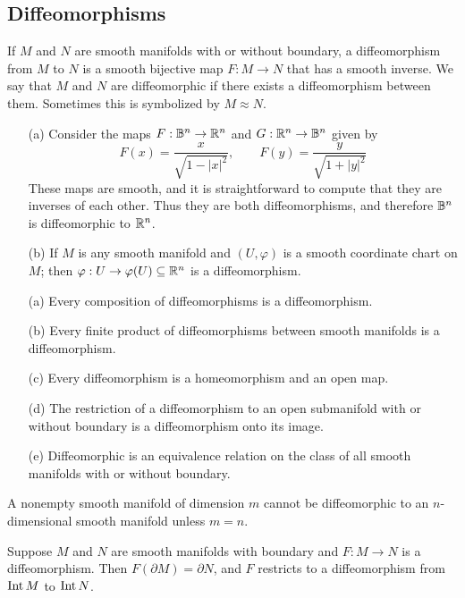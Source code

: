 \subsection{Diffeomorphisms}
If $M$ and $N$ are smooth manifolds with or without boundary, a diffeomorphism from $M$ to $N$ is a smooth bijective map $F:M\to N$ that has a smooth inverse. We say that $M$ and $N$ are diffeomorphic if there exists a diffeomorphism between them. Sometimes this is symbolized by $M\approx N$.
\begin{example}
\mbox{}
\begin{itemize}
\item[(a)]Consider the maps $F:\mathbb{B}^n\to\mathbb{R}^n$ and $G:\mathbb{R}^n\to\mathbb{B}^n$ given by
\[F(x)=\frac{x}{\sqrt{1-|x|^2}},\quad\quad F(y)=\frac{y}{\sqrt{1+|y|^2}}\]
These maps are smooth, and it is straightforward to compute that they are inverses of each other. Thus they are both diffeomorphisms, and therefore $\mathbb{B}^n$ is diffeomorphic to $\mathbb{R}^n$.
\item[(b)]If $M$ is any smooth manifold and $(U,\varphi)$ is a smooth coordinate chart on $M$; then $\varphi:U\to\varphi(U)\subseteq\mathbb{R}^n$ is a diffeomorphism.
\end{itemize}
\end{example}
\begin{proposition}
\mbox{}
\begin{itemize}
\item[(a)] Every composition of diffeomorphisms is a diffeomorphism.
\item[(b)] Every finite product of diffeomorphisms between smooth manifolds is a diffeomorphism.
\item[(c)] Every diffeomorphism is a homeomorphism and an open map.
\item[(d)] The restriction of a diffeomorphism to an open submanifold with or without boundary is a diffeomorphism onto its image.
\item[(e)] Diffeomorphic is an equivalence relation on the class of all smooth manifolds with or without boundary.
\end{itemize}
\end{proposition}
\begin{proposition}
A nonempty smooth manifold of dimension $m$ cannot be diffeomorphic to an $n$-dimensional smooth manifold unless $m=n$.
\end{proposition}
\begin{proposition}
Suppose $M$ and $N$ are smooth manifolds with boundary and $F:M\to N$ is a diffeomorphism. Then $F(\partial M)=\partial N$, and $F$ restricts to a diffeomorphism from $\mathrm{Int}\, M$ to $\mathrm{Int}\, N$.
\end{proposition}
